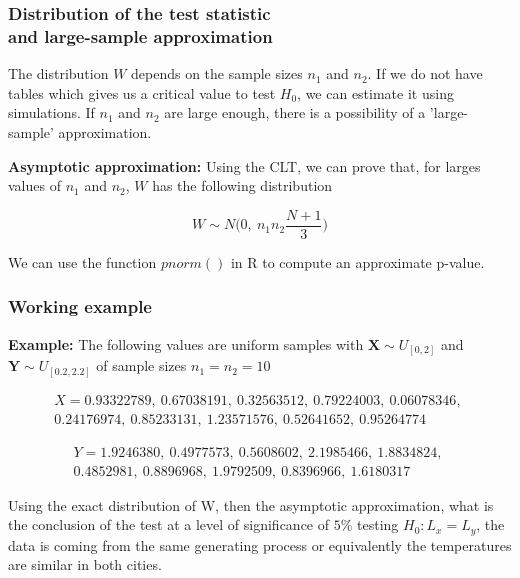 \documentclass[border=5mm, convert, usenames, dvipsnames,beamer]{standalone}
\begin{document}
\begin{frame}
\frametitle{Distribution of the test statistic \\ and large-sample approximation}

\vspace{40}
\noindent
The distribution $W$ depends on the sample sizes $n_{1}$ and $n_{2}$. If we do not have tables which gives us a critical value to test $H_{0}$, we can estimate it using simulations. If $n_{1}$ and $n_{2}$ are large enough, there is a possibility of a 'large-sample' approximation.

\vspace{5}
\noindent
\textbf{Asymptotic approximation:} Using the CLT, we can prove that, for larges values of $n_{1}$ and $n_{2}$, $W$ has the following distribution

$$
W \sim N \bigg( 0, \ n_{1} n_{2} \frac{N+1}{3}  \bigg)
$$

\vspace{5}
\noindent
We can use the function $pnorm()$ in R to compute an approximate p-value.

\end{frame}
















\begin{frame}
\frametitle{Working example}

\vspace{50}
\noindent
\textbf{Example:} The following values are uniform samples with $\mathbf{X} \sim U_{[0, 2]}$ and $\mathbf{Y} \sim U_{[0.2, 2.2]}$ of sample sizes $n_{1} = n_{2} = 10$

$$
\begin{align*} 
X = 0.93322789, \ 0.67038191, \ 0.32563512, \ 0.79224003, \ 0.06078346, \ \\
0.24176974, \ 0.85233131, \ 1.23571576, \ 0.52641652, \ 0.95264774
\end{align*}
$$

$$
\begin{align*} 
Y = 1.9246380, \ 0.4977573, \ 0.5608602, \ 2.1985466, \ 1.8834824, \ \\ 0.4852981, \ 0.8896968, \ 1.9792509, \ 0.8396966, \ 1.6180317
\end{align*}
$$

\vspace{5}
\noindent
Using the exact distribution of W, then the asymptotic approximation, what is the conclusion of the test at a level of significance of $5 \%$ testing $H_{0}: L_{x} = L_{y}$, the data is coming from the same generating process or equivalently the temperatures are similar in both cities.

\end{frame}
\end{document}
